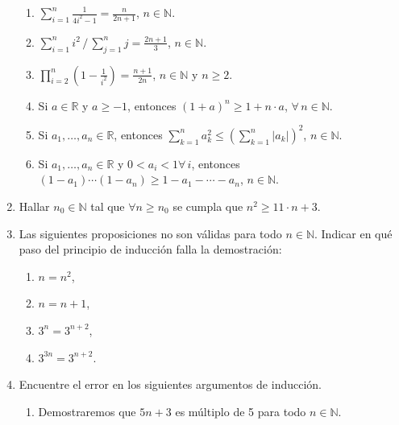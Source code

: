 \documentclass[12pt,spanish,makeidx]{amsbook}
\begin{document}
\begin{enumerate}
\begin{enumerate}
  \item $\displaystyle{ \sum_{i=1}^n \frac{1}{4i^2-1} = \frac{n}{2n+1}}$, $n\in \mathbb N$.

  \item $\displaystyle{ \sum_{i=1}^n i^2\, /\, \sum_{j=1}^n j = \frac{2n+1}{3}}$, $n\in \mathbb N$.

  \item $\displaystyle{ \prod_{i=2}^n \left(1-\frac{1}{i^2}\right) = \frac{n+1}{2n}}$, $n\in \mathbb N$ y $ n\ge 2$.

  \item Si $a\in \mathbb R$ y $a\geq -1$, entonces $(1+a)^n\geq 1+n\cdot a$, $\forall \, n \in \mathbb N$.

  \item Si $a_1,\dots,a_n \in \mathbb R$, entonces $\displaystyle{\sum_{k=1}^n a_{k}^{2}\leq \left(\sum_{k=1}^n |a_{k}|\right)^{2}}$, $n\in \mathbb N$.


  \item Si $a_1,\dots,a_n \in \mathbb R$ y $0<a_i<1 \forall \, i$, entonces $(1-a_1)\cdots(1-a_n)\ge 1-a_1-\cdots -a_n$, $n\in \mathbb N$.

  \end{enumerate}

\smallskip




\item Hallar $n_0 \in {\mathbb N}$ tal que $\forall n \ge n_0$ se cumpla que $n^2 \ge 11 \cdot n + 3$.

\smallskip


\item Las siguientes proposiciones no son válidas para todo $n \in {\mathbb N}$. Indicar en qué paso del principio de inducción falla la demostración:
\begin{multicols}{4}
\begin{enumerate}
\item  $n=n^2$,
\item  $n=n+1$,
\item  $3^n = 3^{n+2}$,
\item  $3^{3n} = 3^{n+2}$.
\end{enumerate}
\end{multicols}

\smallskip

\item Encuentre el error en los siguientes argumentos de inducción.
\begin{enumerate}
\item  Demostraremos que $5n+3$ es múltiplo de 5 para todo $n\in \mathbb N$.


\end{enumerate}
\end{enumerate}
\end{document}
